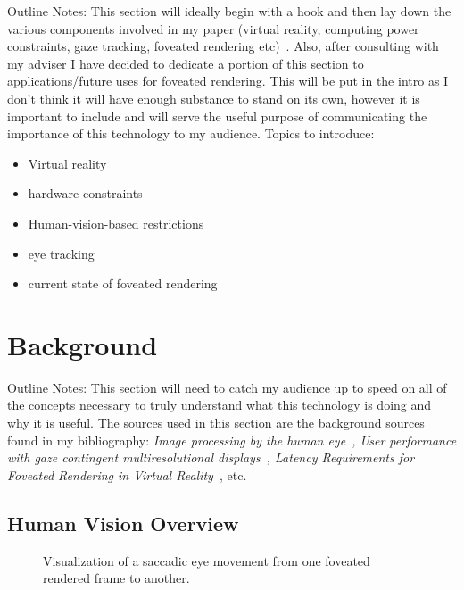 \documentclass{sig-alternate}
\begin{document}
Outline Notes: This section will ideally begin with a hook and then lay down the various components involved in my paper (virtual reality, computing power constraints, gaze tracking, foveated rendering etc)~\cite{Patney:Towards,Guenter:Foveated,Swafford:User}. Also, after consulting with my adviser I have decided to dedicate a portion of this section to applications/future uses for foveated rendering. This will be put in the intro as I don't think it will have enough substance to stand on its own, however it is important to include and will serve the useful purpose of communicating the importance of this technology to my audience.  
Topics to introduce:
\begin{itemize}
\item Virtual reality
\item hardware constraints
\item Human-vision-based restrictions
\item eye tracking
\item current state of foveated rendering
\end{itemize}

\section{Background}
\label{sec:background}

Outline Notes: This section will need to catch my audience up to speed on all of the concepts necessary to truly understand what this technology is doing and why it is useful.
The sources used in this section are the background sources found in my bibliography: \textit{Image processing by the human eye~\cite{Thibos:Image}, User performance with gaze contingent multiresolutional displays~\cite{Swafford:User}, Latency Requirements for Foveated Rendering in Virtual Reality~\cite{Albert:Latency}}, etc.

\subsection{Human Vision Overview}
\label{sec:visionOverview}

\begin{figure}
\centering
{}
\caption{Visualization of a saccadic eye movement from one foveated rendered frame to another.~\cite{Albert:Latency}}
\label{fig:fig1}
\end{figure}
\end{document}
